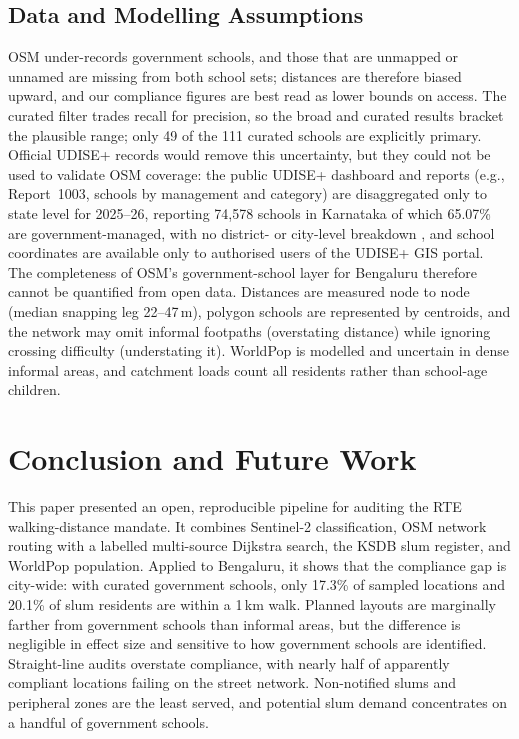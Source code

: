 \documentclass[conference]{IEEEtran}
\newcommand{\km}{\,km}
\newcommand{\m}{\,m}
\begin{document}
\subsection{Data and Modelling Assumptions}
OSM under-records government schools, and those that are unmapped or unnamed are missing from both school sets; distances are therefore biased upward, and our compliance figures are best read as lower bounds on access. The curated filter trades recall for precision, so the broad and curated results bracket the plausible range; only 49 of the 111 curated schools are explicitly primary. Official UDISE+ records would remove this uncertainty, but they could not be used to validate OSM coverage: the public UDISE+ dashboard and reports (e.g., Report~1003, schools by management and category) are disaggregated only to state level for 2025--26, reporting 74,578 schools in Karnataka of which 65.07\% are government-managed, with no district- or city-level breakdown \cite{udise2026}, and school coordinates are available only to authorised users of the UDISE+ GIS portal. The completeness of OSM's government-school layer for Bengaluru therefore cannot be quantified from open data. Distances are measured node to node (median snapping leg 22--47\m{}), polygon schools are represented by centroids, and the network may omit informal footpaths (overstating distance) while ignoring crossing difficulty (understating it). WorldPop is modelled and uncertain in dense informal areas, and catchment loads count all residents rather than school-age children.

\section{Conclusion and Future Work}\label{sec:conclusion}
This paper presented an open, reproducible pipeline for auditing the RTE walking-distance mandate. It combines Sentinel-2 classification, OSM network routing with a labelled multi-source Dijkstra search, the KSDB slum register, and WorldPop population. Applied to Bengaluru, it shows that the compliance gap is city-wide: with curated government schools, only 17.3\% of sampled locations and 20.1\% of slum residents are within a 1\km{} walk. Planned layouts are marginally farther from government schools than informal areas, but the difference is negligible in effect size and sensitive to how government schools are identified. Straight-line audits overstate compliance, with nearly half of apparently compliant locations failing on the street network. Non-notified slums and peripheral zones are the least served, and potential slum demand concentrates on a handful of government schools.
\end{document}
